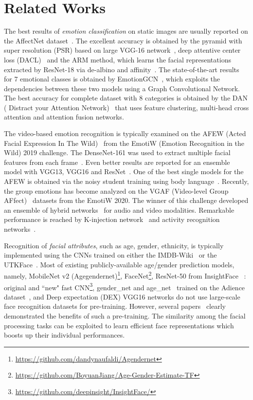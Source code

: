 \documentclass[runningheads]{llncs}
\begin{document}
\section{Related Works}\label{sec:2}
The best results of \textit{emotion classification} on static images are usually reported on the AffectNet dataset~\cite{mollahosseini2017affectnet}. The excellent accuracy is obtained by the pyramid with super resolution (PSR) based on large VGG-16 network~\cite{vo2020pyramid}, deep attentive center loss (DACL)~\cite{farzaneh2021facial} and the ARM method, which learns the facial representations extracted by ResNet-18 via de-albino and affinity~\cite{shi2021learning}. The state-of-the-art results for 7 emotional classes is obtained by EmotionGCN~\cite{antoniadis2021exploiting}, which exploits the dependencies between these two models using a Graph
Convolutional Network. The best accuracy for complete dataset with 8 categories is obtained by the DAN ( Distract your Attention Network)~\cite{wen2021distract} that uses feature clustering, multi-head cross attention and attention fusion networks. 

The video-based emotion recognition is typically examined on the AFEW (Acted Facial Expression In The Wild)~\cite{dhall2019emotiw} from the EmotiW (Emotion Recognition in the Wild) 2019 challenge. The DenseNet-161 was used to extract multiple facial features from each frame~\cite{liu2018multi}. Even better results are reported for an ensemble model with VGG13, VGG16 and ResNet~\cite{bargal2016emotion}. One of the best single models for the AFEW is obtained via the noisy student training using body language~\cite{kumar2020noisy}. Recently, the group emotions has become analyzed on the VGAF (Video-level Group AFfect)~\cite{sharma2019automatic} datasets from the EmotiW 2020. The winner of this challenge developed an ensemble of hybrid networks~\cite{liu2020group} for audio and video modalities. Remarkable performance is reached by K-injection network~\cite{wang2020implicit} and activity recognition networks~\cite{pinto2020audiovisual}.

Recognition of \textit{facial attributes}, such as age, gender, ethnicity, is typically implemented using the CNNs trained on either the IMDB-Wiki~\cite{rothe2015dex} or the UTKFace~\cite{zhang2017age}. Most of existing publicly-available age/gender prediction models, namely, MobileNet v2 (Agegendernet)\footnote{\label{Agegendernet}\url{https://github.com/dandynaufaldi/Agendernet}}, FaceNet\footnote{\url{https://github.com/BoyuanJiang/Age-Gender-Estimate-TF}}, ResNet-50 from InsightFace ~\cite{deng2018arcface}: original and ``new" fast CNN\footnote{\url{https://github.com/deepinsight/InsightFace/}}, gender\_net and age\_net~\cite{levi2015age} trained on the Adience dataset~\cite{eidinger2014age}, 
and Deep expectation (DEX) VGG16 networks do not use large-scale face recognition datasets for pre-training. However, several papers~\cite{wang2021multi,savchenko2019peerj} clearly demonstrated the benefits of such a pre-training. The similarity among the facial processing tasks can be exploited to learn efficient face representations which boosts up their individual performances. 
\end{document}
